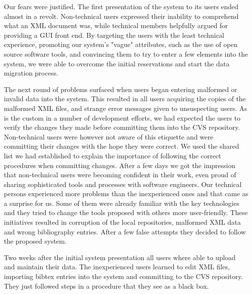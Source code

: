 \documentclass[10pt]{article}
\begin{document}
Our fears were justified.
The first presentation of the system to its users ended
almost in a revolt.
Non-technical users expressed their inability to comprehend
what an XML document was, while technical members
helpfully argued for providing a GUI front end.
By targeting the users with the least technical experience,
promoting our system's "vague" attributes,
such as the use of open source software tools,
and convincing them to try to enter a few elements into
the system, we were able to overcome the initial reservations
and start the data migration process.

The next round of problems surfaced when users began entering
malformed or invalid data into the system.
This resulted in all users acquiring the copies of the malformed
XML files, and strange error messages given to unsuspecting
users.
As is the custom in a number of development efforts, we had
expected the users to verify the changes they made before
committing them into the CVS repository.
Non-technical users were however not aware of this etiquette
and were committing their changes with the hope they were correct.
We used the shared list we had established to explain the
importance of following the correct procedures when committing changes.
After a few days we got the impression that non-technical users
were becoming confident in their work, even proud of sharing
sophisticated tools and processes with software engineers.
Our technical persons experienced more problems than the inexperienced ones 
and that came as a surprise for us. Some of them were already familiar 
with the key technologies and they tried to change the tools proposed with others more user-friendly. 
These initiatives resulted in corruption of the local repositories, malformed XML data and wrong bibliography entries.
After a few false attempts they decided to follow the proposed system.

Two weeks after the initial system presentation all users where able to upload 
and maintain their data. The inexperienced users learned to edit XML files,
importing bibtex entries into the system and committing to the CVS repository. 
They just followed steps in a procedure that they see as a black box. 
\end{document}

